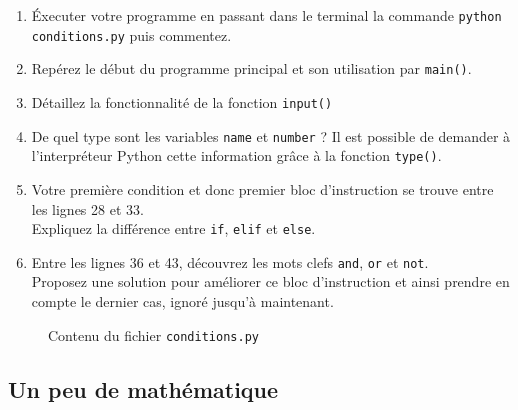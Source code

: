 \begin{enumerate}
\item Éxecuter votre programme en passant dans le terminal la commande \texttt{python conditions.py} puis commentez.

\item Repérez le début du programme principal et son utilisation par \texttt{main()}.

\item Détaillez la fonctionnalité de la fonction \texttt{input()}

\item De quel type sont les variables \texttt{name} et \texttt{number} ? Il est possible de demander à l'interpréteur Python cette information grâce à la fonction \texttt{type()}.

\item Votre première condition et donc premier bloc d'instruction se trouve entre les lignes 28 et 33.\\
  Expliquez la différence entre \texttt{if}, \texttt{elif} et \texttt{else}.

\item Entre les lignes 36 et 43, découvrez les mots clefs \texttt{and}, \texttt{or} et \texttt{not}.\\
  Proposez une solution pour améliorer ce bloc d'instruction et ainsi prendre en
  compte le dernier cas, ignoré jusqu'à maintenant.


\end{enumerate}

\begin{figure}  
  
  \caption{Contenu du fichier \texttt{conditions.py}}
  \label{polynome_conditions}
\end{figure}


\subsection{Un peu de mathématique}

